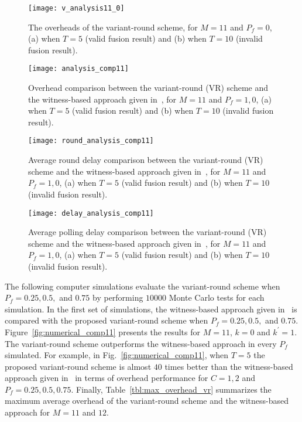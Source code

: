 \documentclass[12pt, onecolumn, draftcls]{IEEEtran}
\begin{document}
\begin{figure}
\centering
\texttt{[image: v\_analysis11\_0]}
\caption{The overheads of the variant-round scheme, for $M=11$ and
$P_f=0$, (a) when $T=5$ (valid fusion result) and (b) when $T=10$
(invalid fusion result).} \label{fig:v_analysis11_0}
\end{figure}
\begin{figure}
\centering
\texttt{[image: analysis\_comp11]}
\caption{Overhead comparison between the variant-round (VR) scheme
and the witness-based approach given in~\cite{du:assurance}, for
$M=11$ and $P_f=1,0$, (a) when $T=5$ (valid fusion result) and (b)
when $T=10$ (invalid fusion result).} \label{fig:analysis_comp11}
\end{figure}
\begin{figure}
\centering
\texttt{[image: round\_analysis\_comp11]}
\caption{Average round delay comparison between the variant-round
(VR) scheme and the witness-based approach given
in~\cite{du:assurance}, for $M=11$ and $P_f=1,0$, (a) when $T=5$
(valid fusion result) and (b) when $T=10$ (invalid fusion result).}
\label{fig:round_analysis_comp11}
\end{figure}
\begin{figure}
\centering
\texttt{[image: delay\_analysis\_comp11]}
\caption{Average polling delay comparison between the variant-round
(VR) scheme and the witness-based approach given
in~\cite{du:assurance}, for $M=11$ and $P_f=1,0$, (a) when $T=5$
(valid fusion result) and (b) when $T=10$ (invalid fusion result).}
\label{fig:delay_analysis_comp11}
\end{figure}

The following computer simulations evaluate the variant-round scheme
when $P_f = 0.25, 0.5,$ and $0.75$ by performing $10000$ Monte Carlo
tests for each simulation. In the first set of simulations, the
witness-based approach given in~\cite{du:assurance} is compared with
the proposed variant-round scheme when $P_f = 0.25, 0.5,$ and
$0.75$. Figure~\ref{fig:numerical_comp11} presents the results for
$M=11$, $k=0$ and $k^{\prime}=1$. The variant-round scheme
outperforms the witness-based approach in every $P_f$ simulated. For
example, in Fig.~\ref{fig:numerical_comp11}, when $T=5$ the proposed
variant-round scheme is almost $40$ times better than the
witness-based approach given in~\cite{du:assurance} in terms of
overhead performance for $C=1,2$ and $P_f=0.25, 0.5, 0.75$. Finally,
Table~\ref{tbl:max_overhead_vr} summarizes the maximum average
overhead of the variant-round scheme and the witness-based approach
for $M=11$ and $12$.
\end{document}
